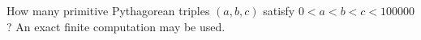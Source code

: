 How many primitive Pythagorean triples $(a,b,c)$ satisfy $0<a<b<c<100000$? An exact finite computation may be used.

